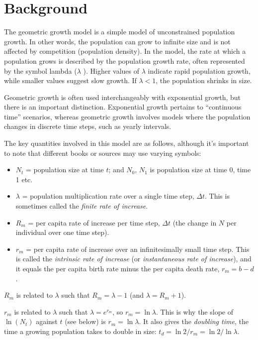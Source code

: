\documentclass[
  a4paper]{book}
\providecommand{\tightlist}{%
  \setlength{\itemsep}{0pt}\setlength{\parskip}{0pt}}
\begin{document}
\section{Background}\label{background-2}

The geometric growth model is a simple model of unconstrained population growth. In other words, the population can grow to infinite size and is not affected by competition (population density). In the model, the rate at which a population grows is described by the population growth rate, often represented by the symbol lambda (\(\lambda\) ). Higher values of \(\lambda\) indicate rapid population growth, while smaller values suggest slow growth. If \(\lambda < 1\), the population shrinks in size.

Geometric growth is often used interchangeably with exponential growth, but there is an important distinction. Exponential growth pertains to ``continuous time'' scenarios, whereas geometric growth involves models where the population changes in discrete time steps, such as yearly intervals.

The key quantities involved in this model are as follows, although it's important to note that different books or sources may use varying symbols:

\begin{itemize}
\tightlist
\item
  \(N_t\) = population size at time \(t\); and \(N_0\), \(N_1\) is population size at time 0, time 1 etc.
\item
  \(\lambda\) = population multiplication rate over a single time step, \(\Delta t\). This is sometimes called the \emph{finite rate of increase}.
\item
  \(R_m\) = per capita rate of increase per time step, \(\Delta t\) (the change in \(N\) per individual over one time step).
\item
  \(r_m\) = per capita rate of increase over an infinitesimally small time step. This is called the \emph{intrinsic rate of increase} (or \emph{instantaneous rate of increase}), and it equals the per capita birth rate minus the per capita death rate, \(r_m = b - d\).
\end{itemize}

\(R_m\) is related to \(\lambda\) such that \(R_m = \lambda - 1\) (and \(\lambda = R_m + 1\)).

\(r_m\) is related to \(\lambda\) such that \(\lambda = e^{r_m}\), so \(r_m = \ln \lambda\). This is why the slope of \(\ln(N_t)\) against \(t\) (see below) is \(r_m = \ln \lambda\). It also gives the \emph{doubling time}, the time a growing population takes to double in size: \(t_d = \ln 2 / r_m = \ln 2 / \ln \lambda\).
\end{document}
